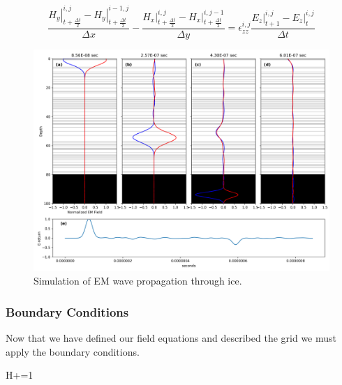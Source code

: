 \documentclass[a4paper]{article}
\begin{document}
\begin{equation}
    \frac{\left. H_y \right\vert_{t+\frac{\Delta t}{2}}^{i,j} - \left. H_y \right\vert_{t+\frac{\Delta t}{2}}^{i-1,j}}{\Delta x} - \frac{\left. H_x \right\vert_{t+\frac{\Delta t}{2}}^{i,j} - \left. H_x \right\vert_{t+\frac{\Delta t}{2}}^{i,j-1}}{\Delta y} = \epsilon_{zz}^{i,j} \frac{\left. E_z \right\vert_{t+1}^{i,j} - \left. E_z \right\vert_{t}^{i,j}}{\Delta t}
\end{equation}

\begin{figure}
    \centering
    \includegraphics[width=\textwidth]{./Figures/IceSimulation.png}
    \caption{Simulation of EM wave propagation through ice.}
    \label{fig:Ice}
\end{figure}

\subsubsection{Boundary Conditions}

Now that we have defined our field equations and described the grid we must apply the boundary conditions. 

\begin{center}
    \colorbox[RGB]{239,240,241}{
    \begin{minipage}{.9\linewidth}
        \begin{algorithmic}[H]
            \State H+=1
            \EndFor
        \end{algorithmic}
    \end{minipage}}
\end{center}
\end{document}
